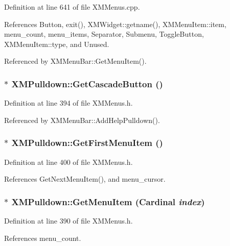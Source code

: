 Definition at line 641 of file XMMenus.cpp.

References Button, exit(), XMWidget::getname(), XMMenu\-Item::item, menu\_\-count, menu\_\-items, Separator, Submenu, Toggle\-Button, XMMenu\-Item::type, and Unused.

Referenced by XMMenu\-Bar::Get\-Menu\-Item().
\subsubsection{$\ast$ XMPulldown::Get\-Cascade\-Button ()\hspace{0.3cm}{\tt  [inline]}}\label{classXMPulldown_a16}




Definition at line 394 of file XMMenus.h.

Referenced by XMMenu\-Bar::Add\-Help\-Pulldown().
\subsubsection{$\ast$ XMPulldown::Get\-First\-Menu\-Item ()\hspace{0.3cm}{\tt  [inline]}}\label{classXMPulldown_a18}




Definition at line 400 of file XMMenus.h.

References Get\-Next\-Menu\-Item(), and menu\_\-cursor.
\subsubsection{$\ast$ XMPulldown::Get\-Menu\-Item (Cardinal {\em index})\hspace{0.3cm}{\tt  [inline]}}\label{classXMPulldown_a14}




Definition at line 390 of file XMMenus.h.

References menu\_\-count.
